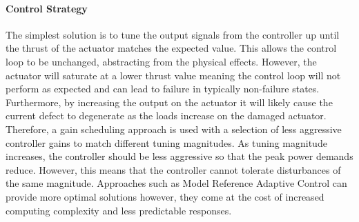 \paragraph{Control Strategy}
The simplest solution is to tune the output signals from the controller up until the thrust of the actuator matches the expected value. This allows the control loop to be unchanged, abstracting from the physical effects. However, the actuator will saturate at a lower thrust value meaning the control loop will not perform as expected and can lead to failure in typically non-failure states. Furthermore, by increasing the output on the actuator it will likely cause the current defect to degenerate as the loads increase on the damaged actuator. Therefore, a gain scheduling approach is used with a selection of less aggressive controller gains to match different tuning magnitudes. As tuning magnitude increases, the controller should be less aggressive so that the peak power demands reduce. However, this means that the controller cannot tolerate disturbances of the same magnitude. Approaches such as Model Reference Adaptive Control can provide more optimal solutions however, they come at the cost of increased computing complexity and less predictable responses.
